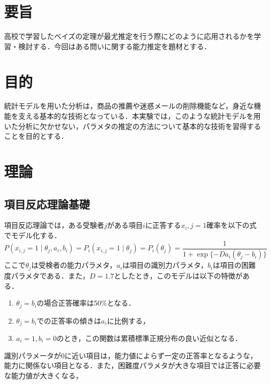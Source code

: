\documentclass[12pt]{jarticle}
\begin{document}



\section{要旨}
高校で学習したベイズの定理が最尤推定を行う際にどのように応用されるかを学習・検討する．今回はある問いに関する能力推定を題材とする．

\section{目的}
統計モデルを用いた分析は，商品の推薦や迷惑メールの削除機能など，身近な機能を支える基本的な技術となっている．本実験では，このような統計モデルを用いた分析に欠かせない，パラメタの推定の方法について基本的な技術を習得することを目的とする．

\section{理論}
\subsection{項目反応理論基礎}
項目反応理論では，ある受験者$j$がある項目$i$に正答する$x_i,j=1$確率を以下の式でモデル化する．
\begin{equation}
    P(x_{i,j}=1 \mid \theta _j,a_i,b_i)= P_i(x_{i,j}=1 \mid \theta _j)=P_i(\theta _j)=\frac{1}{1+\exp\{-Da_i(\theta_j -b_i)\}}
\end{equation}
ここで$\theta_j$は受検者の能力パラメタ，$a_i$は項目の識別力パラメタ，$b_i$は項目の困難度パラメタである．また，$D=1.7$としたとき，このモデルは以下の特徴がある．
\begin{enumerate}
    \item $\theta_j=b_i$の場合正答確率は50\%となる．
    \item $\theta_j=b_i$での正答率の傾きは$a_i$に比例する，
    \item $a_i=1,b_i=0$のとき，この関数は累積標準正規分布の良い近似となる．
\end{enumerate}
識別パラメータが0に近い項目は，能力値によらず一定の正答率となるような，能力に関係ない項目となる．また，困難度パラメタが大きな項目では正答に必要な能力値が大きくなる，
\end{document}
